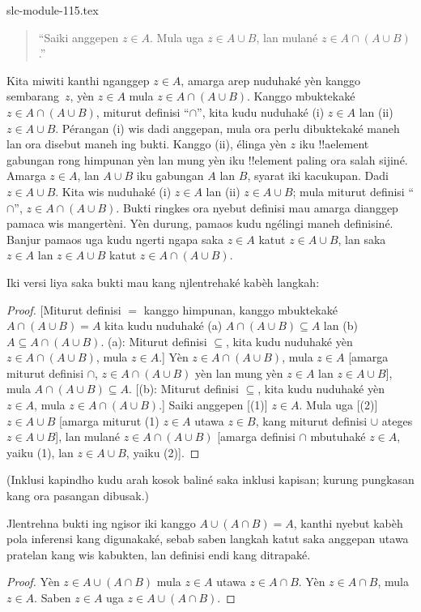\begin{filecontents*}[overwrite]{slc-module-115.tex}
\begin{quote}
``Saiki anggepen $z \in A$. Mula uga $z \in A \cup B$, lan
mulané $z \in A \cap (A \cup B)$.''
\end{quote}

Kita miwiti kanthi nganggep $z \in A$, amarga arep
nuduhaké yèn kanggo sembarang~$z$, yèn $z \in A$
mula $z \in A \cap (A \cup B)$. Kanggo mbuktekaké
$z \in A \cap (A \cup B)$, miturut definisi
``$\cap$'', kita kudu nuduhaké (i) $z \in A$
lan (ii) $z \in A \cup B$. Pérangan (i) wis
dadi anggepan, mula ora perlu dibuktekaké maneh
lan ora disebut maneh ing bukti. Kanggo (ii), élinga
yèn $z$ iku !!a{element} gabungan rong himpunan
yèn lan mung yèn iku !!{element} paling ora salah
sijiné. Amarga $z \in A$, lan $A \cup B$ iku
gabungan $A$ lan $B$, syarat iki kacukupan.
Dadi $z \in A \cup B$. Kita wis nuduhaké
(i) $z \in A$ lan (ii) $z \in A \cup B$;
mula miturut definisi ``$\cap$'',
$z \in A \cap (A \cup B)$. Bukti ringkes
ora nyebut definisi mau amarga dianggep pamaca
wis mangertèni. Yèn durung, pamaos
kudu ngélingi maneh definisiné. Banjur
pamaos uga kudu ngerti ngapa saka $z
\in A$ katut $z \in A \cup B$, lan saka
$z \in A$ lan $z \in A \cup B$ katut
$z \in A \cap (A \cup B)$.

Iki versi liya saka bukti mau kang njlentrehaké
kabèh langkah:
\begin{proof}{}
[Miturut definisi $=$ kanggo himpunan, kanggo
  mbuktekaké $A \cap (A \cup B) = A$
  kita kudu nuduhaké (a)
  $A \cap (A \cup B) \subseteq A$ lan (b)
  $A \subseteq A \cap (A \cup B)$.
  (a): Miturut definisi $\subseteq$, kita kudu
  nuduhaké yèn $z \in A \cap (A \cup B)$,
  mula $z \in A$.] Yèn $z \in A
\cap (A \cup B)$, mula $z \in A$
[amarga miturut definisi $\cap$,
$z \in A \cap (A \cup B)$ yèn lan mung
yèn $z \in A$ lan $z \in A \cup B$],
mula $A \cap (A \cup B) \subseteq A$.
[(b): Miturut definisi $\subseteq$,
kita kudu nuduhaké yèn $z \in A$,
mula $z \in A \cap (A \cup B)$.]
Saiki anggepen [(1)] $z \in A$.
Mula uga [(2)] $z \in A \cup B$
[amarga miturut (1) $z \in A$ utawa
$z \in B$, kang miturut definisi $\cup$
ateges $z \in A \cup B$], lan mulané
$z \in A \cap (A \cup B)$
[amarga definisi $\cap$ mbutuhaké
$z \in A$, yaiku (1), lan
$z \in A \cup B$, yaiku (2)].
\end{proof}
(Inklusi kapindho kudu arah kosok baliné saka inklusi kapisan; kurung pungkasan kang ora pasangan dibusak.)

\begin{prob}
Jlentrehna bukti ing ngisor iki kanggo
$A \cup (A \cap B) = A$, kanthi nyebut kabèh
pola inferensi kang digunakaké, sebab saben
langkah katut saka anggepan utawa pratelan kang
wis kabukten, lan definisi endi kang ditrapaké.
\begin{proof}
  Yèn $z \in A \cup (A \cap B)$ mula $z \in A$
  utawa $z \in A \cap B$. Yèn
  $z \in A \cap B$, mula $z \in A$.
  Saben $z \in A$ uga $z \in A \cup (A
  \cap B)$.
\end{proof}
\end{prob}


\end{filecontents*}

